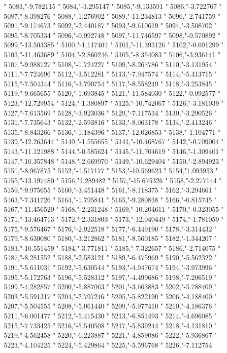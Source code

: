 "
5083,"-9.782115
"
5084,"-3.295147
"
5085,"-9.133591
"
5086,"-3.722767
"
5087,"-8.398276
"
5088,"-1.276902
"
5089,"-11.234813
"
5090,"-2.741759
"
5091,"-9.174673
"
5092,"-2.440187
"
5093,"-9.610619
"
5094,"-3.508702
"
5095,"-8.705334
"
5096,"-0.992748
"
5097,"-11.746597
"
5098,"-0.570892
"
5099,"-13.503385
"
5100,"-1.117401
"
5101,"-11.393126
"
5102,"-0.091299
"
5103,"-11.463689
"
5104,"-2.860246
"
5105,"-8.354083
"
5106,"-3.936141
"
5107,"-9.988727
"
5108,"-1.724227
"
5109,"-8.267786
"
5110,"-3.131954
"
5111,"-7.724696
"
5112,"-3.512281
"
5113,"-7.947574
"
5114,"-5.413715
"
5115,"-7.504344
"
5116,"-3.790754
"
5117,"-8.558249
"
5118,"-3.253845
"
5119,"-9.665655
"
5120,"-1.693845
"
5121,"-11.584030
"
5122,"-0.092577
"
5123,"-12.729954
"
5124,"-1.380897
"
5125,"-10.742067
"
5126,"-3.181039
"
5127,"-7.613569
"
5128,"-3.923036
"
5129,"-7.117534
"
5130,"-3.290526
"
5131,"-7.735643
"
5132,"-2.593816
"
5133,"-8.063178
"
5134,"-2.413246
"
5135,"-8.843266
"
5136,"-1.184396
"
5137,"-12.026853
"
5138,"-1.104771
"
5139,"-12.263644
"
5140,"-1.555655
"
5141,"-10.468767
"
5142,"-0.709004
"
5143,"-11.121988
"
5144,"-0.585624
"
5145,"-11.704619
"
5146,"-1.309401
"
5147,"-10.357848
"
5148,"-2.669970
"
5149,"-10.629404
"
5150,"-2.894923
"
5151,"-8.967875
"
5152,"-1.517177
"
5153,"-10.569623
"
5154,"1.093953
"
5155,"-13.197480
"
5156,"1.289482
"
5157,"-15.675326
"
5158,"-2.277144
"
5159,"-9.975655
"
5160,"-3.451448
"
5161,"-8.118375
"
5162,"-3.294661
"
5163,"-7.341726
"
5164,"-1.795841
"
5165,"-9.280838
"
5166,"-0.815745
"
5167,"-11.456520
"
5168,"-2.231248
"
5169,"-10.204611
"
5170,"-0.323055
"
5171,"-13.464713
"
5172,"-2.331803
"
5173,"-12.040449
"
5174,"-1.781059
"
5175,"-9.576467
"
5176,"-2.922518
"
5177,"-6.449190
"
5178,"-3.314432
"
5179,"-8.630080
"
5180,"-3.212862
"
5181,"-8.560185
"
5182,"-1.344207
"
5183,"-10.551459
"
5184,"-3.771811
"
5185,"-7.322657
"
5186,"-2.714075
"
5187,"-8.281552
"
5188,"-2.583121
"
5189,"-6.475969
"
5190,"-5.562322
"
5191,"-5.611031
"
5192,"-5.630544
"
5193,"-4.947674
"
5194,"-3.973996
"
5195,"-5.172763
"
5196,"-5.528312
"
5197,"-4.499686
"
5198,"-7.206519
"
5199,"-4.282857
"
5200,"-5.887063
"
5201,"-3.663883
"
5202,"-5.788409
"
5203,"-5.591317
"
5204,"-2.797246
"
5205,"-5.822190
"
5206,"-4.188400
"
5207,"-5.504555
"
5208,"-5.061440
"
5209,"-5.977410
"
5210,"-4.186376
"
5211,"-6.001477
"
5212,"-5.415430
"
5213,"-6.851493
"
5214,"-4.696085
"
5215,"-7.733425
"
5216,"-5.540508
"
5217,"-5.839244
"
5218,"-4.131810
"
5219,"-4.562458
"
5220,"-6.223887
"
5221,"-4.859086
"
5222,"-5.936867
"
5223,"-4.104225
"
5224,"-5.429864
"
5225,"-5.596768
"
5226,"-7.112754
